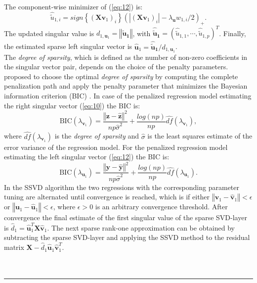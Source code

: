 The component-wise minimizer of (\ref{eq:12}) is:
\begin{equation}
\hat{\tilde{u}}_{1,i}=\textit{sign}\left\{(\mathbf{X}\mathbf{v}_{1})_{i}\right\}(|(\mathbf{X}\mathbf{v}_{1})_{i}|-\lambda_{\mathbf{u}}w_{1,i}/2)_{+}.
\end{equation}
The updated singular value is $d_{1,\mathbf{u}_{1}}=\left\Vert\mathbf{\tilde{u}_{1}}\right\Vert$, with $\mathbf{\hat{\tilde{u}}_{1}}=(\hat{\tilde{u}}_{1,1},\cdots,\hat{\tilde{u}}_{1,p})^{T}$. Finally, the estimated sparse left singular vector is $\mathbf{\hat{u}}_{1}=\mathbf{\hat{\tilde{u}}_{1}}/d_{1,\mathbf{u}_{1}}$.\\

The \textit{degree of sparsity}, which is defined as the number of non-zero coefficients in the singular vector pair, depends on the choice of the penalty parameters.
\citet{Lee2010} proposed to choose the optimal \textit{degree of sparsity} by computing the complete penalization path and apply the penalty parameter that minimizes the Bayesian information criterion (BIC) \cite{Schwarz1978}. In case of the penalized regression model estimating the right singular vector (\ref{eq:10}) the BIC is:
\begin{equation}
\text{BIC}(\lambda_{\mathbf{v}_{1}})=\frac{\left\Vert \mathbf{z}- \hat{\mathbf{z}} \right\Vert^{2}}{np\hat{\sigma}^{2}} + \frac{log(np)}{np} \hat{df}(\lambda_{\mathbf{v}_{1}}), 
\end{equation}
where $\hat{df}(\lambda_{\mathbf{v}_{1}})$ is the \textit{degree of sparsity} and $\hat{\sigma}$ is the least squares estimate of the error variance of the regression model. For the penalized regression model estimating the left singular vector (\ref{eq:12}) the BIC is:
\begin{equation}
\text{BIC}(\lambda_{\mathbf{u}_{1}})=\frac{\left\Vert \mathbf{y}- \hat{\mathbf{y}} \right\Vert^{2}}{np\hat{\sigma}^{2}} + \frac{log(np)}{np} \hat{df}(\lambda_{\mathbf{u}_{1}}).
\end{equation}
In the SSVD algorithm the two regressions with the corresponding parameter tuning are alternated until convergence is reached, which is if either $\left\Vert \mathbf{v}_{1} - \mathbf{\hat{v}}_{1}\right\Vert < \epsilon$ or $\left\Vert \mathbf{u}_{1} - \mathbf{\hat{u}}_{1} \right\Vert < \epsilon$, where $\epsilon > 0$ is an arbitrary convergence threshold. After convergence the final estimate of the first singular value of the sparse SVD-layer is $\hat{d}_{1}=\mathbf{\hat{u}}_{1}^{T}\mathbf{X}\mathbf{\hat{v}}_{1}$. The next sparse rank-one approximation can be obtained by subtracting the sparse SVD-layer and applying the SSVD method to the residual matrix $\mathbf{X}-\hat{d}_{1}\mathbf{\hat{u}}_{1}\mathbf{\hat{v}}_{1}^{T}$. \\
\\
\\
\hspace{-0.1cm} 
\rule{14.75 cm}{1pt}

